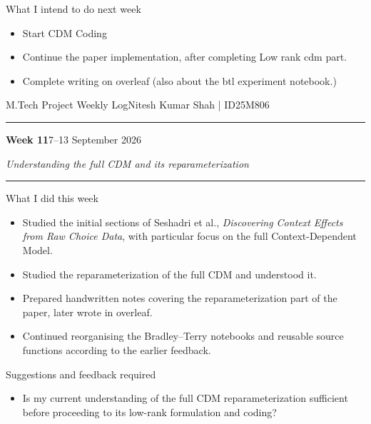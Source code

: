 \documentclass[10pt]{article}
\newcommand{\weekheading}[3]{%
  {\small M.Tech Project Weekly Log}\hfill{\small Nitesh Kumar Shah \;|\; ID25M806}\par
  \vspace{2pt}\hrule\vspace{7pt}
  {\Large\bfseries Week #1}\hfill{\normalsize #2}\par
  \vspace{2pt}
  {\itshape #3}\par
  \vspace{5pt}\hrule\vspace{7pt}
}
\begin{document}
\begin{weeklybox}{What I intend to do next week}
  \small
  \begin{itemize}
    \item Start CDM Coding 
    \item Continue the paper implementation, after completing Low rank cdm part.
    \item Complete writing on overleaf (also about the btl experiment notebook.)
  \end{itemize}
\end{weeklybox}


\newpage

\weekheading{11}{7--13 September 2026}
{Understanding the full CDM and its reparameterization}

\begin{weeklybox}{What I did this week}

  \small

  \begin{itemize}

    \item Studied the initial sections of Seshadri et al.,
    \emph{Discovering Context Effects from Raw Choice Data},
    with particular focus on the full Context-Dependent Model.

    \item Studied the reparameterization of the full CDM and understood it. 
    
    \item Prepared handwritten notes covering the reparameterization
    part of the paper, later wrote in overleaf.

    \item Continued reorganising the Bradley--Terry notebooks and
    reusable source functions according to the earlier feedback.

  \end{itemize}

\end{weeklybox}

\begin{weeklybox}{Suggestions and feedback required}

  \small

  \begin{itemize}

    \item Is my current understanding of the full CDM
    reparameterization sufficient before proceeding to its
    low-rank formulation and coding?


  \end{itemize}

\end{weeklybox}
\end{document}
